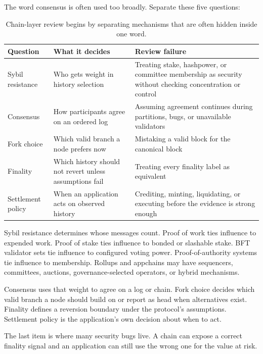 The word consensus is often used too broadly. Separate these five questions:

\begin{table}[htbp]
\centering
\small
\renewcommand{\arraystretch}{1.18}
\begin{tabularx}{\textwidth}{@{}>{\RaggedRight\arraybackslash}p{}>{\RaggedRight\arraybackslash}p{}X@{}}
\toprule
Question & What it decides & Review failure \\
\midrule
Sybil resistance & Who gets weight in history selection & Treating stake, hashpower, or committee membership as security without checking concentration or control \\
Consensus & How participants agree on an ordered log & Assuming agreement continues during partitions, bugs, or unavailable validators \\
Fork choice & Which valid branch a node prefers now & Mistaking a valid block for the canonical block \\
Finality & Which history should not revert unless assumptions fail & Treating every finality label as equivalent \\
Settlement policy & When an application acts on observed history & Crediting, minting, liquidating, or executing before the evidence is strong enough \\
\bottomrule
\end{tabularx}
\caption{Chain-layer review begins by separating mechanisms that are often hidden inside one word.}
\end{table}

Sybil resistance determines whose messages count. Proof of work ties influence to expended work. Proof of stake ties influence to bonded or slashable stake. BFT validator sets tie influence to configured voting power. Proof-of-authority systems tie influence to membership. Rollups and appchains may have sequencers, committees, auctions, governance-selected operators, or hybrid mechanisms.

Consensus uses that weight to agree on a log or chain. Fork choice decides which valid branch a node should build on or report as head when alternatives exist. Finality defines a reversion boundary under the protocol's assumptions. Settlement policy is the application's own decision about when to act.

The last item is where many security bugs live. A chain can expose a correct finality signal and an application can still use the wrong one for the value at risk.

